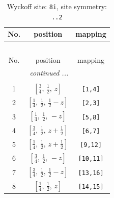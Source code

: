 \documentclass[fleqn,8pt]{jsarticle}
\begin{document}
\renewcommand{\arraystretch}{1.2}
\begin{longtable}{ccc}
\caption{Wyckoff site: {\tt 8i}, site symmetry: {\tt ..2}}
 \\
 \hline \hline
No. & position & mapping \\ \hline \endfirsthead

\multicolumn{2}{l}{\tablename\ \thetable{}} \\
 \hline \hline
No. & position & mapping \\ \hline \endhead

 \hline \hline
\multicolumn{2}{r}{\footnotesize\it continued ...} \\ \endfoot

 \hline \hline
\multicolumn{2}{r}{} \\ \endlastfoot

1 & $\left[ \frac{3}{4},\, \frac{1}{2},\, z \right]$ & {\tt [1,4]} \\ \hline
2 & $\left[ \frac{1}{4},\, \frac{1}{2},\, \frac{1}{2} - z \right]$ & {\tt [2,3]} \\ \hline
3 & $\left[ \frac{1}{4},\, \frac{1}{2},\, - z \right]$ & {\tt [5,8]} \\ \hline
4 & $\left[ \frac{3}{4},\, \frac{1}{2},\, z + \frac{1}{2} \right]$ & {\tt [6,7]} \\ \hline
5 & $\left[ \frac{1}{4},\, \frac{1}{2},\, z + \frac{1}{2} \right]$ & {\tt [9,12]} \\ \hline
6 & $\left[ \frac{3}{4},\, \frac{1}{2},\, - z \right]$ & {\tt [10,11]} \\ \hline
7 & $\left[ \frac{3}{4},\, \frac{1}{2},\, \frac{1}{2} - z \right]$ & {\tt [13,16]} \\ \hline
8 & $\left[ \frac{1}{4},\, \frac{1}{2},\, z \right]$ & {\tt [14,15]} \\
\end{longtable}
\renewcommand{\arraystretch}{1.2}
\end{document}
